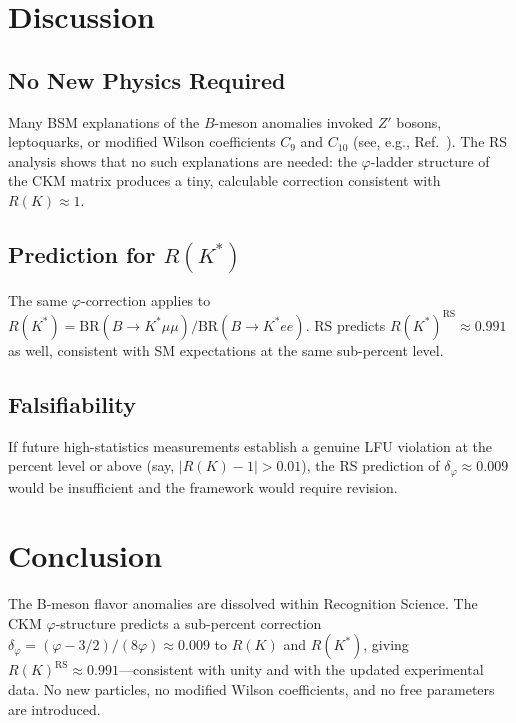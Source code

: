 \documentclass[12pt,a4paper]{article}
\theoremstyle{definition}
\theoremstyle{remark}
\begin{document}
\section{Discussion}
\label{sec:discuss}

\subsection{No New Physics Required}

Many BSM explanations of the $B$-meson anomalies invoked $Z'$ bosons,
leptoquarks, or modified Wilson coefficients $C_9$ and $C_{10}$ (see,
e.g., Ref.~\cite{Altmannshofer2021}).  The RS analysis shows that no
such explanations are needed: the $\varphi$-ladder structure of the CKM
matrix produces a tiny, calculable correction consistent with
$R(K) \approx 1$.

\subsection{Prediction for $R(K^*)$}

The same $\varphi$-correction applies to $R(K^*) = \mathrm{BR}(B \to K^*
\mu\mu)/\mathrm{BR}(B \to K^* ee)$.  RS predicts
$R(K^*)^{\mathrm{RS}} \approx 0.991$ as well, consistent with SM
expectations at the same sub-percent level.

\subsection{Falsifiability}

If future high-statistics measurements establish a genuine LFU violation
at the percent level or above (say, $|R(K) - 1| > 0.01$), the RS
prediction of $\delta_\varphi \approx 0.009$ would be insufficient and
the framework would require revision.

\section{Conclusion}
\label{sec:conclusion}

The B-meson flavor anomalies are dissolved within Recognition Science.
The CKM $\varphi$-structure predicts a sub-percent correction
$\delta_\varphi = (\varphi - 3/2)/(8\varphi) \approx 0.009$ to $R(K)$ and $R(K^*)$,
giving $R(K)^{\mathrm{RS}} \approx 0.991$---consistent with unity and
with the updated experimental data.  No new particles, no modified Wilson
coefficients, and no free parameters are introduced.
\end{document}
